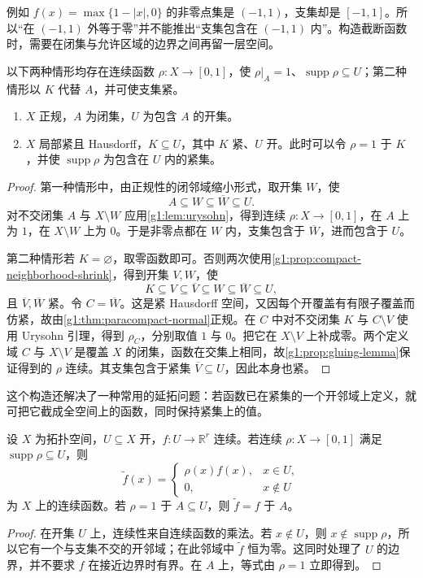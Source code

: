 例如 \(f(x)=\max\{1-|x|,0\}\) 的非零点集是 \((-1,1)\)，支集却是 \([-1,1]\)。所以“在 \((-1,1)\) 外等于零”并不能推出“支集包含在 \((-1,1)\) 内”。构造截断函数时，需要在闭集与允许区域的边界之间再留一层空间。

\begin{proposition}\label{g1:prop:continuous-cutoff}
	以下两种情形均存在连续函数 \(\rho:X\to[0,1]\)，使 \(\rho|_A=1\)、\(\operatorname{supp}\rho\subseteq U\)；第二种情形以 \(K\) 代替 \(A\)，并可使支集紧。
	\begin{enumerate}
		\item \(X\) 正规，\(A\) 为闭集，\(U\) 为包含 \(A\) 的开集。
		\item \(X\) 局部紧且 Hausdorff，\(K\subseteq U\)，其中 \(K\) 紧、\(U\) 开。此时可以令 \(\rho=1\) 于 \(K\)，并使 \(\operatorname{supp}\rho\) 为包含在 \(U\) 内的紧集。
	\end{enumerate}
\end{proposition}
\begin{proof}
	第一种情形中，由正规性的闭邻域缩小形式，取开集 \(W\)，使
	\[
		A\subseteq W\subseteq\overline W\subseteq U.
	\]
	对不交闭集 \(A\) 与 \(X\setminus W\) 应用\cref{g1:lem:urysohn}，得到连续 \(\rho:X\rightarrow[0,1]\)，在 \(A\) 上为 \(1\)，在 \(X\setminus W\) 上为 \(0\)。于是非零点都在 \(W\) 内，支集包含于 \(\overline W\)，进而包含于 \(U\)。

	第二种情形若 \(K=\varnothing\)，取零函数即可。否则两次使用\cref{g1:prop:compact-neighborhood-shrink}，得到开集 \(V,W\)，使
	\[
		K\subseteq V\subseteq\overline V\subseteq W\subseteq\overline W\subseteq U,
	\]
	且 \(\overline V,\overline W\) 紧。令 \(C=\overline W\)。这是紧 Hausdorff 空间，又因每个开覆盖有有限子覆盖而仿紧，故由\cref{g1:thm:paracompact-normal}正规。在 \(C\) 中对不交闭集 \(K\) 与 \(C\setminus V\) 使用 Urysohn 引理，得到 \(\rho_C\)，分别取值 \(1\) 与 \(0\)。把它在 \(X\setminus V\) 上补成零。两个定义域 \(C\) 与 \(X\setminus V\) 是覆盖 \(X\) 的闭集，函数在交集上相同，故\cref{g1:prop:gluing-lemma}保证得到的 \(\rho\) 连续。其支集包含于紧集 \(\overline V\subseteq U\)，因此本身也紧。
\end{proof}

这个构造还解决了一种常用的延拓问题：若函数已在紧集的一个开邻域上定义，就可把它截成全空间上的函数，同时保持紧集上的值。

\begin{corollary}\label{g1:cor:cutoff-extension}
	设 \(X\) 为拓扑空间，\(U\subseteq X\) 开，\(f:U\rightarrow\mathbb R^r\) 连续。若连续 \(\rho:X\rightarrow[0,1]\) 满足 \(\operatorname{supp}\rho\subseteq U\)，则
	\[
		\widetilde f(x)=
		\begin{cases}
			\rho(x)f(x),&x\in U,\\
			0,&x\notin U
		\end{cases}
	\]
	为 \(X\) 上的连续函数。若 \(\rho=1\) 于 \(A\subseteq U\)，则 \(\widetilde f=f\) 于 \(A\)。
\end{corollary}
\begin{proof}
	在开集 \(U\) 上，连续性来自连续函数的乘法。若 \(x\notin U\)，则 \(x\notin\operatorname{supp}\rho\)，所以它有一个与支集不交的开邻域；在此邻域中 \(\widetilde f\) 恒为零。这同时处理了 \(U\) 的边界，并不要求 \(f\) 在接近边界时有界。在 \(A\) 上，等式由 \(\rho=1\) 立即得到。
\end{proof}

